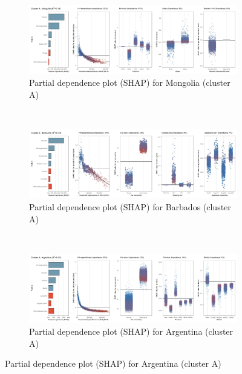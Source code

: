 \begin{figure}[ht!]\ContinuedFloat
    \centering
   \begin{subfigure}[b]{\textwidth}
         \centering
         \caption{Partial dependence plot (SHAP) for Mongolia (cluster A)}
         \label{fig:5b_MNG}
         \includegraphics[width=\textwidth]{Figure 5b/Figure_5b_MNG}         
     \end{subfigure}
    \\
    \vspace{0.5cm}
   \begin{subfigure}[b]{\textwidth}
         \centering
         \caption{Partial dependence plot (SHAP) for Barbados (cluster A)}
         \label{fig:5b_BRB}
         \includegraphics[width=\textwidth]{Figure 5b/Figure_5b_BRB}         
     \end{subfigure}
    \\
    \vspace{0.5cm}
   \begin{subfigure}[b]{\textwidth}
         \centering
         \caption{Partial dependence plot (SHAP) for Argentina (cluster A)}
         \label{fig:5b_ARG}
         \includegraphics[width=\textwidth]{Figure 5b/Figure_5b_ARG}

\end{subfigure}
\end{figure}
